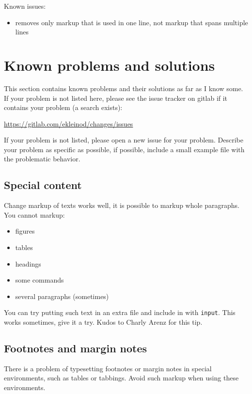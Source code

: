Known issues:

\begin{itemize}
	\item removes only markup that is used in one line, not markup that spans multiple lines
\end{itemize}


\cleardoublepage
\section{Known problems and solutions}
\label{sec:known-problems}

This section contains known problems and their solutions as far as I know some.
If your problem is not listed here, please see the issue tracker on gitlab if it contains your problem (a search exists):

\url{https://gitlab.com/ekleinod/changes/issues}

If your problem is not listed, please open a new issue for your problem.
Describe your problem as specific as possible, if possible, include a small example file with the problematic behavior.

\subsection{Special content}

Change markup of texts works well, it is possible to markup whole paragraphs.
You cannot markup:

\begin{itemize}
	\item figures
	\item tables
	\item headings
	\item some commands
	\item several paragraphs (sometimes)
\end{itemize}

You can try putting such text in an extra file and include in with \texttt{input}.
This works sometimes, give it a try.
Kudos to Charly Arenz for this tip.

\subsection{Footnotes and margin notes}

There is a problem of typesetting footnotes or margin notes in special environments, such as tables or tabbings.
Avoid such markup when using these environments.


